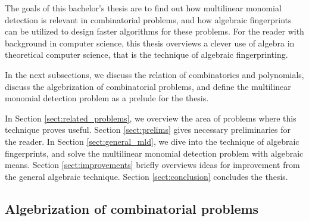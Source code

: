 The goals of this bachelor's thesis are 
to find out how multilinear monomial detection is relevant in combinatorial problems, 
and how algebraic fingerprints can be utilized to design faster 
algorithms for these problems. For the reader with background in computer science, 
this thesis overviews a clever use of algebra in theoretical computer science, 
that is the technique of algebraic fingerprinting.

In the next subsections, we discuss the relation of combinatorics and 
polynomials, discuss the algebrization of combinatorial problems, and 
define the multilinear monomial detection problem as a prelude for the thesis. 

In Section \ref{sect:related_problems}, we overview the area of problems where 
this technique proves useful. Section \ref{sect:prelims} gives necessary 
preliminaries for the reader. In Section \ref{sect:general_mld}, we 
dive into the technique of algebraic fingerprints, and solve the 
multilinear monomial detection problem with algebraic means. 
Section \ref{sect:improvements} briefly overviews ideas for 
improvement from the general algebraic technique. 
Section \ref{sect:conclusion} concludes the thesis.



\subsection{Algebrization of combinatorial problems}
\label{sect:algebrization}

